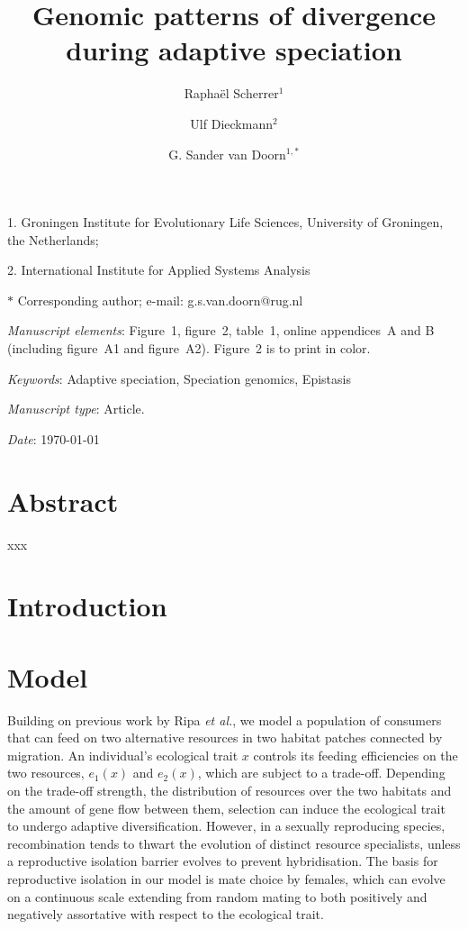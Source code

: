 \documentclass[11pt]{article}
\title{Genomic patterns of divergence during adaptive speciation}
\author{Rapha\"el Scherrer$^1$ \and Ulf Dieckmann$^2$ \and  G. Sander van Doorn$^{1,\ast}$}
\date{}
\begin{document}
\maketitle

\noindent{} 1. Groningen Institute for Evolutionary Life Sciences, University of Groningen, the Netherlands;

\noindent{} 2. International Institute for Applied Systems Analysis

\noindent{} $\ast$ Corresponding author; e-mail: g.s.van.doorn@rug.nl

\bigskip

\textit{Manuscript elements}: Figure~1, figure~2, table~1, online appendices~A and B (including figure~A1 and figure~A2). Figure~2 is to print in color.

\bigskip

\textit{Keywords}: Adaptive speciation, Speciation genomics, Epistasis

\bigskip

\textit{Manuscript type}: Article.

\bigskip

\textit{Date}: \today

\linenumbers{}
\modulolinenumbers[3]

\newpage{}

\section*{Abstract}
xxx 

\newpage{}

\section*{Introduction}


\section*{Model}
Building on previous work by Ripa \textit{et al.}, we model a population of consumers that can feed on two alternative resources in two habitat patches connected by migration. An individual's ecological trait $x$ controls its feeding efficiencies on the two resources, $e_1(x)$ and $e_2(x)$, which are subject to a trade-off. Depending on the trade-off strength, the distribution of resources over the two habitats and the amount of gene flow between them, selection can induce the ecological trait to undergo adaptive diversification. However, in a sexually reproducing species, recombination tends to thwart the evolution of distinct resource specialists, unless a reproductive isolation barrier evolves to prevent hybridisation. The basis for reproductive isolation in our model is mate choice by females, which can evolve on a continuous scale extending from random mating to both positively and negatively assortative with respect to the ecological trait. 
\end{document}
